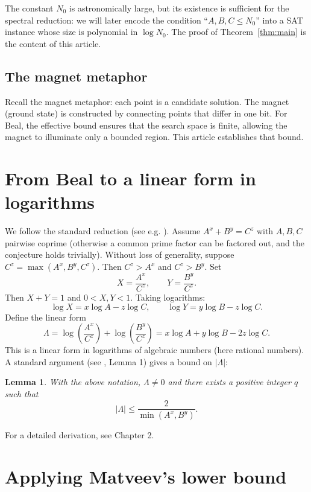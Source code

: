 \documentclass[11pt,a4paper]{article}
\newtheorem{lemma}[theorem]{Lemma}
\begin{document}
The constant \(N_0\) is astronomically large, but its existence is sufficient for the spectral reduction: we will later encode the condition “\(A,B,C \le N_0\)” into a SAT instance whose size is polynomial in \(\log N_0\). The proof of Theorem~\ref{thm:main} is the content of this article.

\subsection{The magnet metaphor}

Recall the magnet metaphor: each point is a candidate solution. The magnet (ground state) is constructed by connecting points that differ in one bit. For Beal, the effective bound ensures that the search space is finite, allowing the magnet to illuminate only a bounded region. This article establishes that bound.

\section{From Beal to a linear form in logarithms}

We follow the standard reduction (see e.g. \cite{stewart-yu}). Assume \(A^x + B^y = C^z\) with \(A,B,C\) pairwise coprime (otherwise a common prime factor can be factored out, and the conjecture holds trivially). Without loss of generality, suppose \(C^z = \max(A^x, B^y, C^z)\). Then \(C^z > A^x\) and \(C^z > B^y\). Set
\[
X = \frac{A^x}{C^z},\qquad Y = \frac{B^y}{C^z}.
\]
Then \(X + Y = 1\) and \(0 < X,Y < 1\). Taking logarithms:
\[
\log X = x\log A - z\log C,\qquad \log Y = y\log B - z\log C.
\]
Define the linear form
\[
\Lambda = \log\left(\frac{A^x}{C^z}\right) + \log\left(\frac{B^y}{C^z}\right) = x\log A + y\log B - 2z\log C.
\]
This is a linear form in logarithms of algebraic numbers (here rational numbers). A standard argument (see \cite{stewart-yu}, Lemma 1) gives a bound on \(|\Lambda|\):

\begin{lemma}\label{lem:logform}
With the above notation, \(\Lambda \neq 0\) and there exists a positive integer \(q\) such that
\[
|\Lambda| \le \frac{2}{\min(A^x, B^y)}.
\]
\end{lemma}
For a detailed derivation, see \cite{wong} Chapter 2.

\section{Applying Matveev's lower bound}
\end{document}
